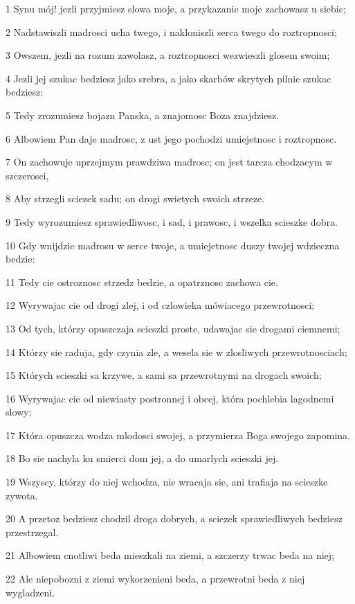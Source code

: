 \par 1 Synu mój! jezli przyjmiesz slowa moje, a przykazanie moje zachowasz u siebie;
\par 2 Nadstawiszli madrosci ucha twego, i nakloniszli serca twego do roztropnosci;
\par 3 Owszem, jezli na rozum zawolasz, a roztropnosci wezwieszli glosem swoim;
\par 4 Jezli jej szukac bedziesz jako srebra, a jako skarbów skrytych pilnie szukac bedziesz:
\par 5 Tedy zrozumiesz bojazn Panska, a znajomosc Boza znajdziesz.
\par 6 Albowiem Pan daje madrosc, z ust jego pochodzi umiejetnosc i roztropnosc.
\par 7 On zachowuje uprzejmym prawdziwa madrosc; on jest tarcza chodzacym w szczerosci,
\par 8 Aby strzegli sciezek sadu; on drogi swietych swoich strzeze.
\par 9 Tedy wyrozumiesz sprawiedliwosc, i sad, i prawosc, i wszelka scieszke dobra.
\par 10 Gdy wnijdzie madrosu w serce twoje, a umiejetnosc duszy twojej wdzieczna bedzie:
\par 11 Tedy cie ostroznosc strzedz bedzie, a opatrznosc zachowa cie.
\par 12 Wyrywajac cie od drogi zlej, i od czlowieka mówiacego przewrotnosci;
\par 13 Od tych, którzy opuszczaja scieszki proste, udawajac sie drogami ciemnemi;
\par 14 Którzy sie raduja, gdy czynia zle, a wesela sie w zlosliwych przewrotnosciach;
\par 15 Których scieszki sa krzywe, a sami sa przewrotnymi na drogach swoich;
\par 16 Wyrywajac cie od niewiasty postronnej i obcej, która pochlebia lagodnemi slowy;
\par 17 Która opuszcza wodza mlodosci swojej, a przymierza Boga swojego zapomina.
\par 18 Bo sie nachyla ku smierci dom jej, a do umarlych scieszki jej.
\par 19 Wszyscy, którzy do niej wchodza, nie wracaja sie, ani trafiaja na scieszke zywota.
\par 20 A przetoz bedziesz chodzil droga dobrych, a sciezek sprawiedliwych bedziesz przestrzegal.
\par 21 Albowiem cnotliwi beda mieszkali na ziemi, a szczerzy trwac beda na niej;
\par 22 Ale niepobozni z ziemi wykorzenieni beda, a przewrotni beda z niej wygladzeni.

